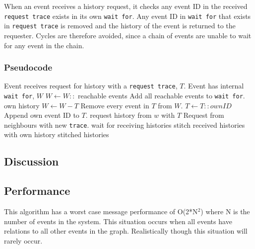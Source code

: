 \newpar When an event receives a history request, it checks any event ID in the received \texttt{request trace} exists in its own \texttt{wait for}. Any event ID in \texttt{wait for} that exists in \texttt{request trace} is removed and the history of the event is returned to the requester. 
Cycles are therefore avoided, since a chain of events are unable to wait for any event in the chain.


\subsubsection*{Pseudocode}
\begin{algorithmic}
	\State Event receives request for history with a \texttt{request trace}, $T$.
	\State Event has internal \texttt{wait for}, $W$
	\State
	\State $W\gets W::$ reachable events \Comment Add all reachable events to \texttt{wait for}.
	\Return own history
	\Else
	\State $W\gets W-T$ \Comment Remove every event in $T$ from $W$.
	\State $T\gets T::ownID$ \Comment Append own event ID to $T$.
	\State
	\State request history from $w$ with $T$ \Comment Request from neighbours with new \texttt{trace}.
	\EndFor
	\State wait for receiving histories
	\State stitch received histories with own history
	\State
	\Return stitched histories
	\EndIf
\end{algorithmic}


\subsection{Discussion} %

\subsection{Performance} %
This algorithm has a worst case message performance of O(2*N$^2$) where N is the number of events in the system. This situation occurs when all events have relations to all other events in the graph. Realistically though this situation will rarely occur.